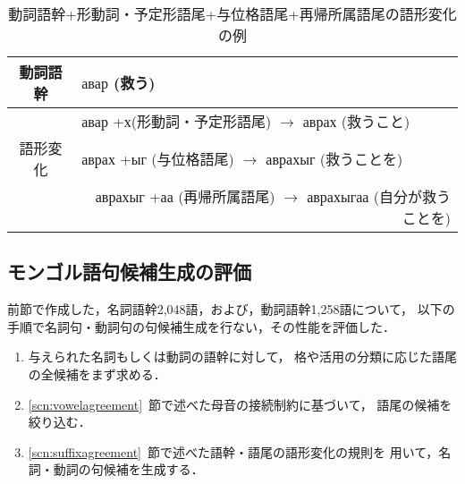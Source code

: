 \begin{table*}
 \caption{\label{tbl:verbnoun1}動詞語幹+形動詞・予定形語尾+与位格語尾+再帰所属語尾の語形変化の例}
 \begin{center}
  \begin{tabular}{|c|ll|}
   \hline
   動詞語幹 & ${а\!\!в\!\!а\!\!р}$ (救う)& \\
   \hline
   & \multicolumn{2}{|l|}{${а\!\!в\!\!а\!\!р}$ +{х}(形動詞・予定形語尾)
   $\longrightarrow$ ${а\!\!в\!\!р\!\!а\!\!х}$ (救うこと)} \\
   語形変化  
   & \multicolumn{2}{|l|}{${а\!\!в\!\!р\!\!а\!\!х}$ +${ы\!\!г}$ (与位格語尾)
   $\longrightarrow$ ${а\!\!в\!\!р\!\!а\!\!х\!\!ы\!\!г}$ (救うことを)} \\
   & \multicolumn{2}{|r|}{${а\!\!в\!\!р\!\!а\!\!х\!\!ы\!\!г}$ +${а\!\!а}$ (再帰所属語尾)
   $\longrightarrow$ ${а\!\!в\!\!р\!\!а\!\!х\!\!ы\!\!г\!\!а\!\!а}$ (自分が救うことを) } \\
   \hline
  \end{tabular}
 \end{center}
\end{table*}


\subsection{モンゴル語句候補生成の評価}
\label{subsec:phrase-result}


前節で作成した，名詞語幹2,048語，および，動詞語幹1,258語について，
以下の手順で名詞句・動詞句の句候補生成を行ない，その性能を評価した．

\begin{enumerate}
 \item 与えられた名詞もしくは動詞の語幹に対して，
       格や活用の分類に応じた語尾の全候補をまず求める．
       
 \item \ref{scn:vowelagreement}~節で述べた母音の接続制約に基づいて，
       語尾の候補を絞り込む．
       
 \item \ref{scn:suffixagreement}~節で述べた語幹・語尾の語形変化の規則を
       用いて，名詞・動詞の句候補を生成する．
\end{enumerate}

